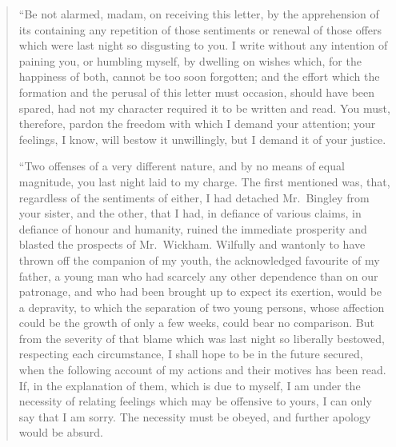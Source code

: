 \documentclass[12pt,english,oneside]{book}
\begin{document}
\begin{quotation}
{}``Be not alarmed, madam, on receiving this letter, by the apprehension
of its containing any repetition of those sentiments or renewal of
those offers which were last night so disgusting to you. I write without
any intention of paining you, or humbling myself, by dwelling on wishes
which, for the happiness of both, cannot be too soon forgotten; and
the effort which the formation and the perusal of this letter must
occasion, should have been spared, had not my character required it
to be written and read. You must, therefore, pardon the freedom with
which I demand your attention; your feelings, I know, will bestow
it unwillingly, but I demand it of your justice.

{}``Two offenses of a very different nature, and by no means of equal
magnitude, you last night laid to my charge. The first mentioned was,
that, regardless of the sentiments of either, I had detached Mr.\ Bingley
from your sister, and the other, that I had, in defiance of various
claims, in defiance of honour and humanity, ruined the immediate prosperity
and blasted the prospects of Mr.\ Wickham. Wilfully and wantonly
to have thrown off the companion of my youth, the acknowledged favourite
of my father, a young man who had scarcely any other dependence than
on our patronage, and who had been brought up to expect its exertion,
would be a depravity, to which the separation of two young persons,
whose affection could be the growth of only a few weeks, could bear
no comparison. But from the severity of that blame which was last
night so liberally bestowed, respecting each circumstance, I shall
hope to be in the future secured, when the following account of my
actions and their motives has been read. If, in the explanation of
them, which is due to myself, I am under the necessity of relating
feelings which may be offensive to yours, I can only say that I am
sorry. The necessity must be obeyed, and further apology would be
absurd.


\end{quotation}
\end{document}
